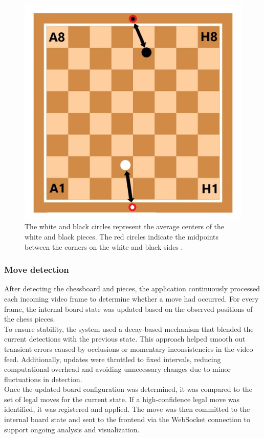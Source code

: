 \begin{figure}[h!]
\centering
\includegraphics[width=0.70\linewidth]{figures/methods/ml-models/label_assignment_board.jpg}
\caption[Assigning labels to chessboard]{The white and black circles represent the average centers of the white and black pieces. The red circles indicate the midpoints between the corners on the white and black sides  \cite{vectorstock:chessboard-svg}.}
\label{fig:board_label_assignment}
\end{figure}



\subsubsection*{Move detection}

After detecting the chessboard and pieces, the application continuously processed each incoming video frame to determine whether a move had occurred. For every frame, the internal board state was updated based on the observed positions of the chess pieces. \\

To ensure stability, the system used a decay-based mechanism that blended the current detections with the previous state. This approach helped smooth out transient errors caused by occlusions or momentary inconsistencies in the video feed. Additionally, updates were throttled to fixed intervals, reducing computational overhead and avoiding unnecessary changes due to minor fluctuations in detection. \\

Once the updated board configuration was determined, it was compared to the set of legal moves for the current state. If a high-confidence legal move was identified, it was registered and applied. The move was then committed to the internal board state and sent to the frontend via the WebSocket connection to support ongoing analysis and visualization.

